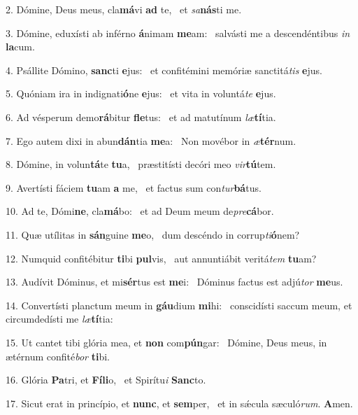 2. Dómine, Deus meus, cla\textbf{má}vi \textbf{ad} te, \ast\  et \textit{sa}\textbf{nás}ti me.\

3. Dómine, eduxísti ab inférno \textbf{á}nimam \textbf{me}am: \ast\  salvásti me a descendéntibus \textit{in} \textbf{la}cum.\

4. Psállite Dómino, \textbf{sanc}ti \textbf{e}jus: \ast\  et confitémini memóriæ sanctitá\textit{tis} \textbf{e}jus.\

5. Quóniam ira in indignati\textbf{ó}ne \textbf{e}jus: \ast\  et vita in voluntá\textit{te} \textbf{e}jus.\

6. Ad vésperum demo\textbf{rá}bitur \textbf{fle}tus: \ast\  et ad matutínum \textit{læ}\textbf{tí}tia.\

7. Ego autem dixi in abun\textbf{dán}tia \textbf{me}a: \ast\  Non movébor in \textit{æ}\textbf{tér}num.\

8. Dómine, in volun\textbf{tá}te \textbf{tu}a, \ast\  præstitísti decóri meo \textit{vir}\textbf{tú}tem.\

9. Avertísti fáciem \textbf{tu}am \textbf{a} me, \ast\  et factus sum con\textit{tur}\textbf{bá}tus.\

10. Ad te, Dómi\textbf{ne}, cla\textbf{má}bo: \ast\  et ad Deum meum de\textit{pre}\textbf{cá}bor.\

11. Quæ utílitas in \textbf{sán}guine \textbf{me}o, \ast\  dum descéndo in corrup\textit{ti}\textbf{ó}nem?\

12. Numquid confitébitur \textbf{ti}bi \textbf{pul}vis, \ast\  aut annuntiábit veritá\textit{tem} \textbf{tu}am?\

13. Audívit Dóminus, et mi\textbf{sér}tus est \textbf{me}i: \ast\  Dóminus factus est adjú\textit{tor} \textbf{me}us.\

14. Convertísti planctum meum in \textbf{gáu}dium \textbf{mi}hi: \ast\  conscidísti saccum meum, et circumdedísti me \textit{læ}\textbf{tí}tia:\

15. Ut cantet tibi glória mea, et \textbf{non} com\textbf{pún}gar: \ast\  Dómine, Deus meus, in ætérnum confité\textit{bor} \textbf{ti}bi.\

16. Glória \textbf{Pa}tri, et \textbf{Fí}\textbf{li}o, \ast\  et Spirítu\textit{i} \textbf{Sanc}to.\

17. Sicut erat in princípio, et \textbf{nunc}, et \textbf{sem}per, \ast\  et in sǽcula sæculó\textit{rum}. \textbf{A}men.\


